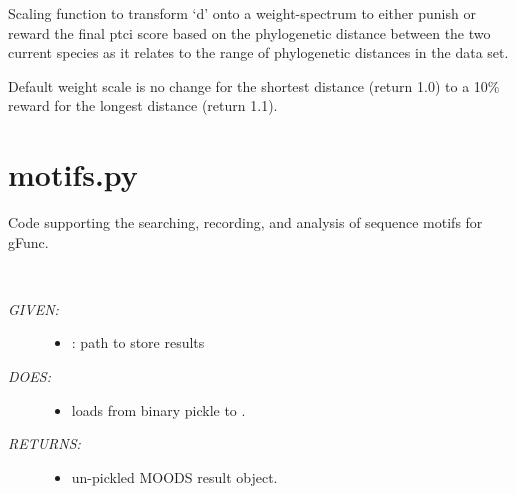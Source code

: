 \documentclass[letterpaper,10pt,english]{sphinxmanual}
\begin{document}
\begin{fulllineitems}
\label{code:gfunc.maths.weight_d_for_ptci}
Scaling function to transform `d' onto a weight-spectrum to either
punish or reward the final ptci score based on the phylogenetic distance
between the two current species as it relates to the range of phylogenetic
distances in the data set.

Default weight scale is no change for the shortest distance (return 1.0) to
a 10\% reward for the longest distance (return 1.1).

\end{fulllineitems}

\label{code:module-gfunc.motifs}

\section{motifs.py}
\label{code:motifs-py}
Code supporting the searching, recording, and analysis of sequence motifs for gFunc.

\begin{fulllineitems}
\label{code:gfunc.motifs.load_MOODS_result}~\begin{description}
\item[{\emph{GIVEN:}}] \leavevmode\begin{itemize}
\item {} 
: path to store results

\end{itemize}

\item[{\emph{DOES:}}] \leavevmode\begin{itemize}
\item {} 
loads  from binary pickle to .

\end{itemize}

\item[{\emph{RETURNS:}}] \leavevmode\begin{itemize}
\item {} 
un-pickled MOODS result object.

\end{itemize}

\end{description}

\end{fulllineitems}
\end{document}
